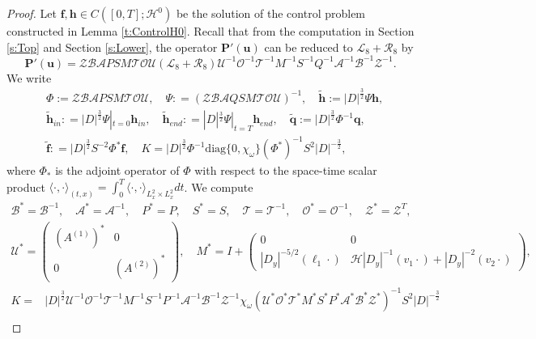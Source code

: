 \documentclass[12pt]{amsart}
\theoremstyle{remark}
\theoremstyle{definition}
\numberwithin{equation}{section}
\renewcommand{\H}{{\mathcal H }}
\newcommand{\f}{\frac}
\newcommand{\mA}{\mathcal{A}}
\newcommand{\mB}{\mathcal{B}}
\newcommand{\mH}{\mathcal{H}}
\newcommand{\mL}{\mathcal{L}}
\newcommand{\mR}{\mathcal{R}}
\newcommand{\mU}{\mathcal{U}}
\newcommand{\mZ}{\mathcal{Z}}
\begin{document}
\begin{proof}
Let $\mathbf{f}, \mathbf{h}\in C([0,T]; \H^0)$ be the solution of the control problem constructed in Lemma \ref{t:ControlH0}.
Recall that from the computation in Section \ref{s:Top} and Section \ref{s:Lower}, the operator $\mathbf{P}'(\mathbf{u})$ can be reduced to $\mL_8 + \mR_8$ by
\begin{equation*}
 \mathbf{P}'(\mathbf{u}) =   \mZ\mB\mA PSM\mathcal{T}\mathcal{O}\mU(\mL_8 + \mR_8)\mU^{-1} \mathcal{O}^{-1}\mathcal{T}^{-1}M^{-1}S^{-1}Q^{-1}\mA^{-1}\mB^{-1}\mZ^{-1}.
\end{equation*}
We write
\begin{align*}
&\Phi := \mZ\mB\mA PSM\mathcal{T}\mathcal{O}\mU, \quad \Psi: = (\mZ\mB\mA QSM\mathcal{T}\mathcal{O}\mU)^{-1},\quad \widetilde{\mathbf{h}} := |D|^{\f32}\Psi\mathbf{h}, \\
&\widetilde{\mathbf{h}}_{in}: =|D|^{\f32}\Psi|_{t=0} \mathbf{h}_{in}, \quad \widetilde{\mathbf{h}}_{end}: =|D|^{\f32}\Psi|_{t=T} \mathbf{h}_{end}, \quad \widetilde{\mathbf{q}} := |D|^{\f32}\Phi^{-1}  \mathbf{q}, \\
&\widetilde{\mathbf{f}}: =|D|^{\f32}S^{-2}\Phi^{*}\mathbf{f}, \quad K =|D|^{\f32}  \Phi^{-1} \text{diag}\{0, \chi_\omega \}(\Phi^{*})^{-1}S^2|D|^{-\f32},
\end{align*}
where $\Phi_*$ is the adjoint operator of $\Phi$  with respect to the space-time scalar product $\langle \cdot, \cdot\rangle_{(t,x)} = \int_0^T \langle \cdot, \cdot\rangle_{L^2_x\times L^2_x}dt$. 
We compute
\begin{align*}
\mB^* = \mB^{-1}, \quad \mA^* = \mA^{-1}, \quad P^* = P, \quad S^* = S, 
\quad \mathcal{T}= \mathcal{T}^{-1}, \quad \mathcal{O}^{*} =  \mathcal{O}^{-1}, \quad \mZ^*= \mZ^T,
\end{align*}
\begin{align*}
\mathcal{U}^* =  \begin{pmatrix}
 (A^{(1)})^*   & 0 \\ 
0 &  (A^{(2)})^*
\end{pmatrix},\quad
    M^*= I +  \begin{pmatrix} 
0 &    0\\ 
|D_y|^{-5/2}(\ell_1\cdot) &  \mH |D_y|^{-1}(v_1\cdot)+   |D_y|^{-2}(v_2\cdot) \end{pmatrix},
\end{align*}
\begin{align*}
K=&|D|^{\f32}\mU^{-1}\mathcal{O}^{-1}\mathcal{T}^{-1}M^{-1}S^{-1}P^{-1}\mA^{-1}\mB^{-1}\mZ^{-1}\chi_{\omega}(\mU^{*}\mathcal{O}^{*}\mathcal{T}^{*}M^{*}S^{*}P^{*}\mA^{*}\mB^{*}\mZ^{*})^{-1}S^2|D|^{-\f32}\\

\end{align*}
\end{proof}
\end{document}
